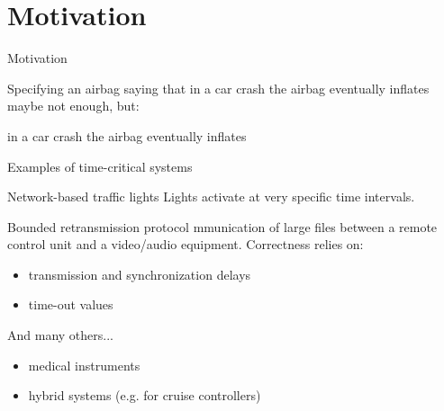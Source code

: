 \documentclass[aspectratio=169]{beamer}
\begin{document}
\frame[plain]{\titlepage}



\section{Motivation}

\begin{slide}{Motivation}\label{xxx}
\small

Specifying an airbag saying that  \alert{in a car crash the airbag eventually inflates}
maybe not enough, but:
\begin{center}
 in a car crash the airbag eventually inflates 
\end{center}

\end{slide}

\begin{slide}{Examples of time-critical systems}
\small
\begin{block}{Network-based traffic lights}
Lights activate at very specific time intervals.
\end{block}

\begin{block}{Bounded retransmission  protocol}
mmunication of large files between a remote control unit and a video/audio equipment. Correctness relies on:
\begin{itemize}
\item transmission and synchronization delays
\item time-out values
\end{itemize}
\end{block}

\begin{block}{And many others...}
\begin{itemize}
\item medical instruments
\item hybrid systems (e.g. for cruise controllers)
\end{itemize}
\end{block}
\end{slide}
\end{document}
